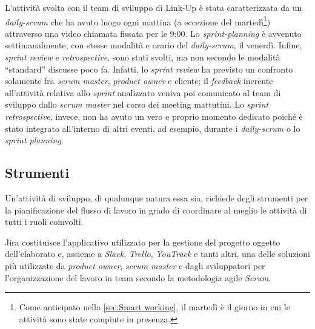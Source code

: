 L'attività svolta con il team di sviluppo di Link-Up è stata caratterizzata da un \textit{daily-scrum} che ha avuto luogo ogni mattina (a eccezione del martedì\footnote{Come anticipato nella \autoref{sec:Smart working}, il martedì è il giorno in cui le attività sono state compiute in presenza.}) attraverso una video chiamata fissata per le 9:00. Lo \textit{sprint-planning} è avvenuto settimanalmente, con stesse modalità e orario del \textit{daily-scrum}, il venerdì.
Infine, \textit{sprint review} e \textit{retrospective}, sono stati svolti, ma non secondo le modalità “standard”  discusse poco fa. Infatti, lo \textit{sprint review} ha previsto un confronto solamente fra \textit{scrum master}, \textit{product owner} e cliente; il \textit{feedback} inerente all'attività relativa allo \textit{sprint} analizzato veniva poi comunicato al team di sviluppo dallo \textit{scrum master} nel corso dei meeting mattutini. Lo \textit{sprint retrospective}, invece, non ha avuto un vero e proprio momento dedicato poiché è stato integrato all'interno di altri eventi, ad esempio, durante i \textit{daily-scrum} o lo \textit{sprint planning}.

\subsection{Strumenti}
Un'attività di sviluppo, di qualunque natura essa sia, richiede degli strumenti per la pianificazione del flusso di lavoro in grado di coordinare al meglio le attività di tutti i ruoli coinvolti.

Jira costituisce l'applicativo utilizzato per la gestione del progetto oggetto dell'elaborato e, assieme a \textit{Slack}, \textit{Trello}, \textit{YouTrack} e tanti altri, una delle soluzioni più utilizzate da \textit{product owner}, \textit{scrum master} e dagli sviluppatori per l'organizzazione del lavoro in team secondo la metodologia agile \textit{Scrum}.  

